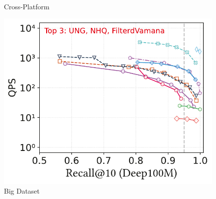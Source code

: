 \documentclass[sigconf, nonacm]{acmart}
\begin{document}
{\begin{figure}
\begin{minipage}[t]{0.39\textwidth}
		\caption{Cross-Platform}
		\label{fig:attribute-cross-platform}
	\end{minipage}%
	\hfill
	\begin{minipage}[t]{0.203\textwidth}
		\centering
		\includegraphics[width=0.96\linewidth]{figures/exp/attribute_100M.pdf} 
		\caption{Big Dataset}
		\label{fig:attribute big dataset}
	\end{minipage}
\end{figure}
	
}
\end{document}
